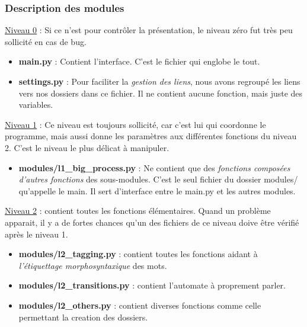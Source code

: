\subsubsection{Description des modules} 

\underline{Niveau 0} : Si ce n'est pour contrôler la présentation, le niveau zéro fut très peu sollicité en cas de bug. 
 
	\begin{itemize}
	\item \textbf{main.py} : Contient l'interface. C'est le fichier qui englobe le tout.
	\item \textbf{settings.py} : Pour faciliter la \emph{gestion des liens}, nous avons regroupé les liens vers nos dossiers dans ce fichier. Il ne contient aucune fonction, mais juste des variables. \\
	\end{itemize}

\underline{Niveau 1} : Ce niveau est toujours sollicité, car c'est lui qui coordonne le programme, mais aussi donne les paramètres aux différentes fonctions du niveau 2. C'est le niveau le plus délicat à manipuler.

	\begin{itemize}
	\item \textbf{modules/l1\_big\_process.py} : Ne contient que des \emph{fonctions composées d'autres fonctions} des sous-modules. C'est le seul fichier du dossier modules/ qu'appelle le main. Il sert d'interface entre le main.py et les autres modules. \\
	\end{itemize}

\underline{Niveau 2} : contient toutes les fonctions élémentaires. Quand un problème apparait, il y a de fortes chances qu'un des fichiers de ce niveau doive être vérifié après le niveau 1.

	\begin{itemize}
	\item \textbf{modules/l2\_tagging.py} : contient toutes les fonctions aidant à \emph{l'étiquettage morphosyntaxique} des mots.
	
	\item \textbf{modules/l2\_transitions.py} : contient l'automate à proprement parler.

	\item \textbf{modules/l2\_others.py} : contient diverses fonctions comme celle permettant la creation des dossiers.
			
    \end{itemize}

